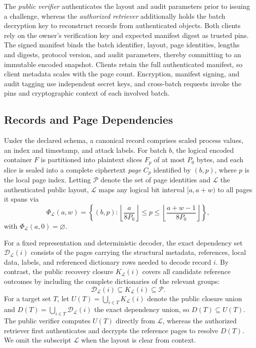 \documentclass[10pt,journal]{IEEEtran}
\begin{document}
The \emph{public verifier} authenticates the layout and audit parameters prior to issuing a challenge, whereas the \emph{authorized retriever} additionally holds the batch decryption key to reconstruct records from authenticated objects. Both clients rely on the owner's verification key and expected manifest digest as trusted pins. The signed manifest binds the batch identifier, layout, page identities, lengths and digests, protocol version, and audit parameters, thereby committing to an immutable encoded snapshot. Clients retain the full authenticated manifest, so client metadata scales with the page count. Encryption, manifest signing, and audit tagging use independent secret keys, and cross-batch requests invoke the pins and cryptographic context of each involved batch.

\subsection{Records and Page Dependencies}
Under the declared schema, a canonical record comprises scaled process values, an index and timestamp, and attack labels. For batch $b$, the logical encoded container $F$ is partitioned into plaintext slices $F_p$ of at most $P_0$ bytes, and each slice is sealed into a complete ciphertext \emph{page} $C_p$ identified by $(b,p)$, where $p$ is the local page index. Letting $\mathcal P$ denote the set of page identities and $\mathcal L$ the authenticated public layout, $\mathcal L$ maps any logical bit interval $[a,a+w)$ to all pages it spans via
\begin{equation}\label{eq:phi}
\Phi_{\mathcal L}(a,w)=
\left\{(b,p):\left\lfloor\frac{a}{8P_0}\right\rfloor
\leq p\leq\left\lfloor\frac{a+w-1}{8P_0}\right\rfloor\right\},
\end{equation}
with $\Phi_{\mathcal L}(a,0)=\varnothing$.

For a fixed representation and deterministic decoder, the exact dependency set $\mathcal D_{\mathcal L}(i)$ consists of the pages carrying the structural metadata, references, local data, labels, and referenced dictionary rows needed to decode record $i$. By contrast, the public recovery closure $K_{\mathcal L}(i)$ covers all candidate reference outcomes by including the complete dictionaries of the relevant groups:
\begin{equation}\label{eq:sufficient-set}
\mathcal D_{\mathcal L}(i)\subseteq K_{\mathcal L}(i)\subseteq\mathcal P.
\end{equation}
For a target set $T$, let $U(T)=\bigcup_{i\in T}K_{\mathcal L}(i)$ denote the public closure union and $D(T)=\bigcup_{i\in T}\mathcal D_{\mathcal L}(i)$ the exact dependency union, so $D(T)\subseteq U(T)$. The public verifier computes $U(T)$ directly from $\mathcal L$, whereas the authorized retriever first authenticates and decrypts the reference pages to resolve $D(T)$. We omit the subscript $\mathcal L$ when the layout is clear from context.
\end{document}
